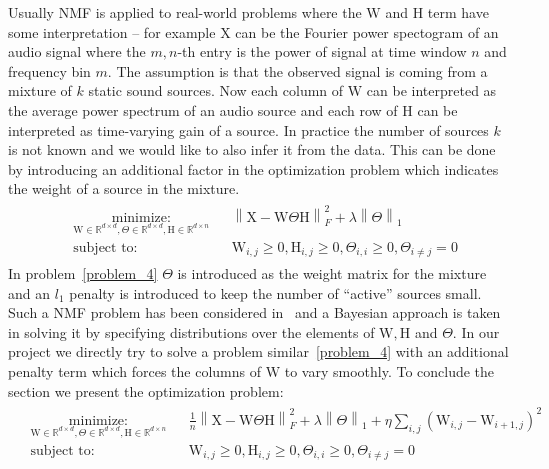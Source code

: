 \documentclass{article}
\newcommand{\0}{\mathrm{0}}
\newcommand{\1}{\mathrm{1}}
\renewcommand{\H}{\mathrm{H}}
\newcommand{\W}{\mathrm{W}}
\newcommand{\X}{\mathrm{X}}
\newcommand{\norm}[1]{\left\| #1 \right\|}
\newcommand{\minimize}[3]{
\begin{aligned}
& \underset{#1}{\textrm{minimize:}}
& & #2 \\
& \textrm{subject to:}
& &  #3
\end{aligned}
}
\begin{document}
\par
Usually NMF is applied to real-world problems where the $\W$ and $\H$ term have some interpretation -- for example $\X$ can be the Fourier power spectogram of an audio signal where the $m,n$-th entry is the power of signal at time window $n$ and frequency bin $m$. The assumption is that the observed signal is coming from a mixture of $k$ static sound sources. Now each column of $\W$ can be interpreted as the average power spectrum of an audio source and each row of $\H$ can be interpreted as time-varying gain of a source. In practice the number of sources $k$ is not known and we would like to also infer it from the data. This can be done by introducing an additional factor in the optimization problem which indicates the weight of a source in the mixture.
\begin{equation}\label{problem_4}
  \begin{aligned}
    \minimize{\W\in \mathbb{R}^{d\times d}, \Theta \in \mathbb{R}^{d\times d},\H \in \mathbb{R}^{d\times n}}{\norm{\X - \W\Theta\H}_F^2 + \lambda\norm{\Theta}_1}{\W_{i,j} \geq 0,\H_{i,j}\geq 0,\Theta_{i,i} \geq 0,\Theta_{i\neq j} = 0}
  \end{aligned}
\end{equation}
In problem~\ref{problem_4} $\Theta$ is introduced as the weight matrix for the mixture and an $l_1$ penalty is introduced to keep the number of ``active'' sources small. Such a NMF problem has been considered in~\cite{blei2010bayesian} and a Bayesian approach is taken in solving it by specifying distributions over the elements of $\W,\H$ and $\Theta$. In our project we directly try to solve a problem similar~\ref{problem_4} with an additional penalty term which forces the columns of $\W$ to vary smoothly. To conclude the section we present the optimization problem:
\begin{equation}\label{problem_5}
  \begin{aligned}
    \minimize{\W\in \mathbb{R}^{d\times d}, \Theta \in \mathbb{R}^{d\times d},\H \in \mathbb{R}^{d\times n}}{\frac{1}{n}\norm{\X - \W\Theta\H}_F^2 + \lambda\norm{\Theta}_1 + \eta\sum_{i,j}\left(\W_{i,j} - \W_{i+1,j}\right)^2}{\W_{i,j} \geq 0,\H_{i,j}\geq 0,\Theta_{i,i} \geq 0,\Theta_{i\neq j} = 0}
  \end{aligned}
\end{equation}
\end{document}
